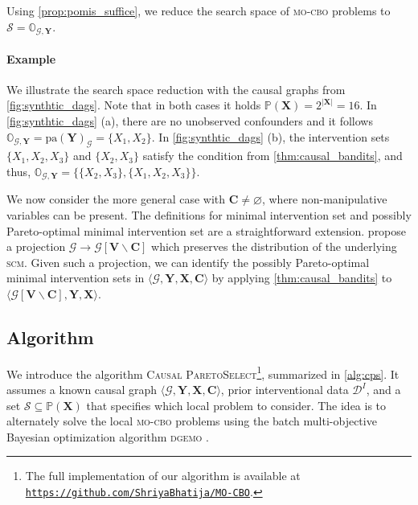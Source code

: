 Using \cref{prop:pomis_suffice}, we reduce the search space of \textsc{mo-cbo} problems to $\mathcal{S} = \mathbb{O}_{\mathcal{G},\mathbf{Y}}$.

\paragraph{Example} We illustrate the search space reduction with the causal graphs from \cref{fig:synthtic_dags}. Note that in both cases it holds $\mathbb{P}(\mathbf{X}) = 2^{|\mathbf{X}|} = 16$. In \cref{fig:synthtic_dags} (a), there are no unobserved confounders and it follows $\mathbb{O}_{\mathcal{G},\mathbf{Y}} = \text{pa}(\mathbf{Y})_{\mathcal{G}} = \{ X_1,X_2\}$. In \cref{fig:synthtic_dags} (b), the intervention sets $\{ X_1,X_2,X_3\}$ and  $\{X_2,X_3\}$ satisfy the condition from \cref{thm:causal_bandits}, and thus, $\mathbb{O}_{\mathcal{G},\mathbf{Y}} = \{ \{ X_2,X_3\}, \{ X_1,X_2,X_3\} \}$.

We now consider the more general case with $\mathbf{C} \neq \varnothing$, where non-manipulative variables can be present. The definitions for minimal intervention set and possibly Pareto-optimal minimal intervention set are a straightforward extension. %
\citet{lee2019structural} propose a projection $\mathcal{G} \rightarrow \mathcal{G}[\mathbf{V} \backslash \mathbf{C}]$ which preserves the distribution of the underlying \textsc{scm}. Given such a projection, we can identify the possibly Pareto-optimal minimal intervention sets in $\langle \mathcal{G},\mathbf{Y},\mathbf{X}, \mathbf{C} \rangle$ by applying \cref{thm:causal_bandits} to $\langle \mathcal{G}[\mathbf{V} \backslash \mathbf{C}],\mathbf{Y},\mathbf{X}\rangle$.


\subsection{Algorithm}\label{subsec:mo_cbo_algorithm}
We introduce the algorithm \textsc{Causal ParetoSelect}\footnote{The full implementation of our algorithm is available at \href{https://github.com/ShriyaBhatija/MO-CBO}{\texttt{https://github.com/ShriyaBhatija/MO-CBO}}.}, summarized in \cref{alg:cps}. It assumes a known causal graph $\langle \mathcal{G},\mathbf{Y}, \mathbf{X}, \mathbf{C} \rangle$, prior interventional data $\mathcal{D}^{I}$, and a set $\mathcal{S} \subseteq \mathbb{P}(\mathbf{X})$ that specifies which local problem to consider. The idea is to alternately solve the local \textsc{mo-cbo} problems using the batch multi-objective Bayesian optimization algorithm \textsc{dgemo} \cite{dgemo}.

